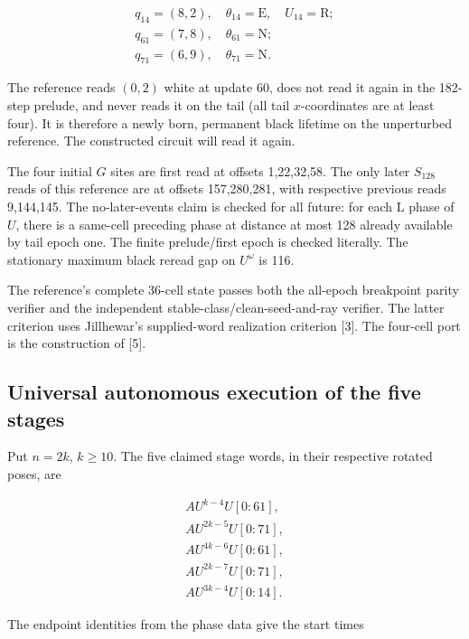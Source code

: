 \documentclass[
  11pt,
]{article}
\begin{document}
\[
\begin{gathered}q_{14}=(8,2),\quad \theta_{14}=\mathrm E,\quad U_{14}=\mathrm R;\\q_{61}=(7,8),\quad \theta_{61}=\mathrm N;\\q_{71}=(6,9),\quad \theta_{71}=\mathrm N.\end{gathered}
\]

The reference reads \((0,2)\) white at update 60, does not read it again in
the 182-step prelude, and never reads it on the tail (all tail
\(x\)-coordinates are at least four). It is therefore a newly born,
permanent black lifetime on the unperturbed reference. The constructed
circuit will read it again.

The four initial \(G\) sites are first read at offsets 1,22,32,58. The only
later $S_{128}$ reads of this reference are at offsets 157,280,281, with
respective previous reads 9,144,145. The no-later-events claim is
checked for all future: for each \(\mathrm L\) phase of \(U\), there is a same-cell
preceding phase at distance at most 128 already available by tail
epoch one. The finite prelude/first epoch is checked literally. The
stationary maximum black reread gap on \(U^\omega\) is 116.

The reference's complete 36-cell state passes both the all-epoch
breakpoint parity verifier and the independent
stable-class/clean-seed-and-ray verifier. The latter criterion uses
Jillhewar's supplied-word realization criterion {[}3{]}.
The four-cell port is the construction of {[}5{]}.

\subsection{Universal autonomous execution of the five
stages}\label{circuit-3}

Put \(n=2k\), $k\ge10$. The five claimed stage words, in their
respective rotated poses, are

\begin{equation}\label{eq:circuit2}
\begin{gathered}AU^{k-4}U[0:61],\\AU^{2k-5}U[0:71],\\AU^{4k-6}U[0:61],\\AU^{2k-7}U[0:71],\\AU^{3k-4}U[0:14].\end{gathered}
\end{equation}

The endpoint identities from the phase data give the start times
\end{document}
